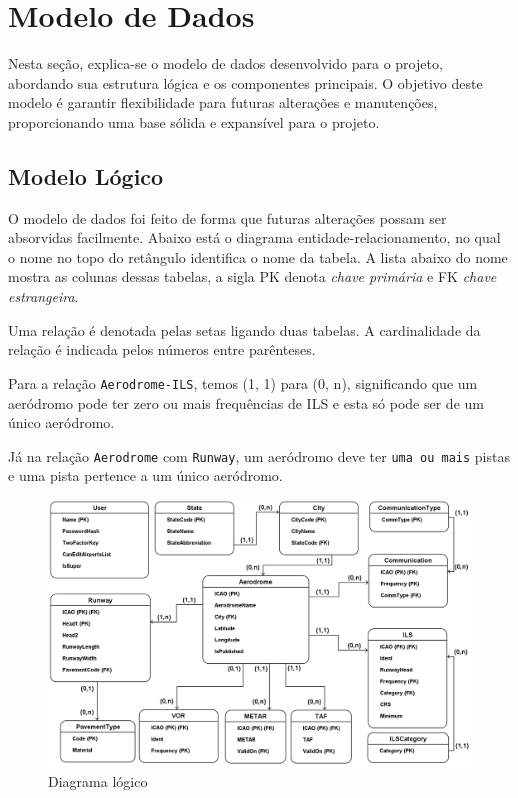 \chapter{Modelo de Dados}

Nesta seção, explica-se o modelo de dados desenvolvido para o projeto, abordando 
sua estrutura lógica e os componentes principais. O objetivo deste modelo é garantir 
flexibilidade para futuras alterações e manutenções, proporcionando uma base sólida 
e expansível para o projeto.

\section{Modelo Lógico}

O modelo de dados foi feito de forma que futuras alterações possam ser absorvidas 
facilmente. Abaixo está o diagrama entidade-relacionamento, no qual o nome no topo 
do retângulo identifica o nome da tabela. A lista abaixo do nome mostra as colunas 
dessas tabelas, a sigla PK denota \textit{chave primária} e FK \textit{chave estrangeira}.

Uma relação é denotada pelas setas ligando duas tabelas. A cardinalidade da relação é indicada
pelos números entre parênteses. 

Para a relação \texttt{Aerodrome-ILS}, temos (1, 1) para (0, n), significando que 
um aeródromo pode ter zero ou mais frequências de ILS e esta só pode ser de um único 
aeródromo.

Já na relação \texttt{Aerodrome} com \texttt{Runway}, um aeródromo deve ter \texttt{uma ou mais} pistas
e uma pista pertence a um único aeródromo.

\pagebreak

\begin{figure}[ht]
    \begin{center}
    \includegraphics[width=400pt]{img/ERAero.png}
    \caption{Diagrama lógico}
    \label{fig:diagrama-er}
    \end{center}
\end{figure}

